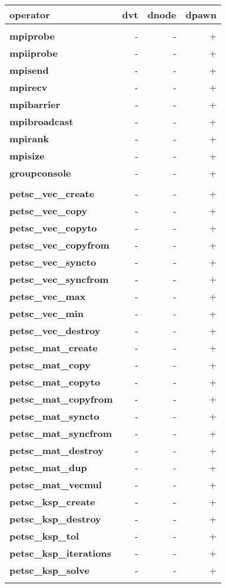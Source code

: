 \begin{tabular}{>{\sffamily\bfseries}l>{\sffamily}r>{\sffamily}r>{\sffamily}r}
operator & dvt & dnode & dpawn \\
\hline\\
mpiprobe & - & - & +\\
mpiiprobe & - & - & +\\
mpisend & - & - & +\\
mpirecv & - & - & +\\
mpibarrier & - & - & +\\
mpibroadcast & - & - & +\\
mpirank & - & - & +\\
mpisize & - & - & +\\
groupconsole & - & - & +\\\\
petsc\_vec\_create & - & - & + \\
petsc\_vec\_copy & - & - & + \\
petsc\_vec\_copyto & - & - & + \\
petsc\_vec\_copyfrom & - & - & + \\
petsc\_vec\_syncto & - & - & + \\
petsc\_vec\_syncfrom & - & - & + \\
petsc\_vec\_max & - & - & + \\
petsc\_vec\_min & - & - & + \\
petsc\_vec\_destroy & - & - & + \\
petsc\_mat\_create & - & - & + \\
petsc\_mat\_copy & - & - & + \\
petsc\_mat\_copyto & - & - & + \\
petsc\_mat\_copyfrom & - & - & + \\
petsc\_mat\_syncto & - & - & + \\
petsc\_mat\_syncfrom & - & - & + \\
petsc\_mat\_destroy & - & - & + \\
petsc\_mat\_dup & - & - & + \\
petsc\_mat\_vecmul & - & - & + \\
petsc\_ksp\_create & - & - & + \\
petsc\_ksp\_destroy & - & - & + \\
petsc\_ksp\_tol & - & - & + \\
petsc\_ksp\_iterations & - & - & + \\
petsc\_ksp\_solve & - & - & + \\\\
\end{tabular}


